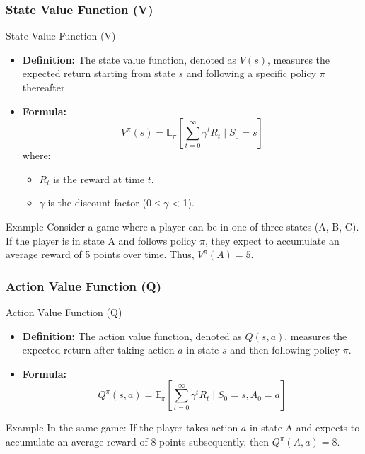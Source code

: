 \documentclass[aspectratio=169]{beamer}
\begin{document}
\begin{frame}[fragile]
  \frametitle{State Value Function (V)}
  \begin{block}{State Value Function (V)}
    \begin{itemize}
      \item \textbf{Definition:} The state value function, denoted as $V(s)$, measures the expected return 
      starting from state $s$ and following a specific policy $\pi$ thereafter.
      \item \textbf{Formula:}
      \begin{equation}
        V^\pi(s) = \mathbb{E}_\pi \left[ \sum_{t=0}^{\infty} \gamma^t R_t \mid S_0 = s \right]
      \end{equation}
      where:
      \begin{itemize}
        \item $R_t$ is the reward at time $t$.
        \item $\gamma$ is the discount factor (0 ≤ $\gamma$ < 1).
      \end{itemize}
    \end{itemize}
  \end{block}
  
  \begin{block}{Example}
    Consider a game where a player can be in one of three states (A, B, C). 
    If the player is in state A and follows policy $\pi$, they expect 
    to accumulate an average reward of 5 points over time. Thus, 
    $V^\pi(A) = 5$.
  \end{block}
\end{frame}

\begin{frame}[fragile]
  \frametitle{Action Value Function (Q)}
  \begin{block}{Action Value Function (Q)}
    \begin{itemize}
      \item \textbf{Definition:} The action value function, denoted as $Q(s, a)$, measures 
      the expected return after taking action $a$ in state $s$ and then following policy $\pi$.
      \item \textbf{Formula:}
      \begin{equation}
        Q^\pi(s, a) = \mathbb{E}_\pi \left[ \sum_{t=0}^{\infty} \gamma^t R_t \mid S_0 = s, A_0 = a \right]
      \end{equation}
    \end{itemize}
  \end{block}
  
  \begin{block}{Example}
    In the same game:
    If the player takes action $a$ in state A and expects to accumulate 
    an average reward of 8 points subsequently, then $Q^\pi(A, a) = 8$.
  \end{block}
\end{frame}
\end{document}
